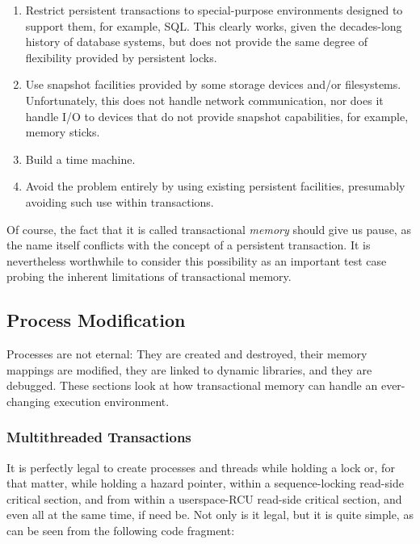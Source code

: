 \begin{enumerate}
\item	Restrict persistent transactions to special-purpose environments
	designed to support them, for example, SQL\@.
	This clearly works, given the decades-long history of database
	systems, but does not provide the same degree of flexibility
	provided by persistent locks.
\item	Use snapshot facilities provided by some storage devices and/or
	filesystems.
	Unfortunately, this does not handle network communication,
	nor does it handle I/O to devices that do not provide snapshot
	capabilities, for example, memory sticks.
\item	Build a time machine.
\item	Avoid the problem entirely by using existing persistent facilities,
	presumably avoiding such use within transactions.
\end{enumerate}

Of course, the fact that it is called transactional \emph{memory}
should give us pause, as the name itself conflicts with the concept of
a persistent transaction.
It is nevertheless worthwhile to consider this possibility as an important
test case probing the inherent limitations of transactional memory.

\subsection{Process Modification}
\label{sec:future:Process Modification}

Processes are not eternal:
They are created and destroyed, their memory mappings are modified,
they are linked to dynamic libraries, and they are debugged.
These sections look at how transactional memory can handle an
ever-changing execution environment.

\subsubsection{Multithreaded Transactions}
\label{sec:future:Multithreaded Transactions}

It is perfectly legal to create processes and threads while holding
a lock or, for that matter, while holding a hazard pointer, within
a sequence-locking read-side critical section, and from within a
userspace-RCU read-side critical section, and even all at the same time,
if need be.
Not only is it legal, but it is quite simple, as can be seen from the
following code fragment:


